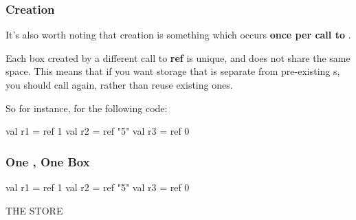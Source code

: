 \documentclass[aspectratio=169, handout]{beamer}
\begin{document}
\begin{frame}[fragile]
  \frametitle{ Creation}

  It's also worth noting that  creation is something which occurs
  \textbf{once per call to }.

  \pause
  \vspace{\fill}

  Each box created by a different call to \textbf{ref} is unique, and does not
  share the same space. This means that if you want storage that is separate
  from pre-existing s, you should call  again, rather than
  reuse existing ones.

  \pause
  \vspace{\fill}

  So for instance, for the following code:

  \begin{codeblock}
    val r1 = ref 1
    val r2 = ref "5"
    val r3 = ref 0
  \end{codeblock}
\end{frame}

\begin{frame}[fragile]
  \frametitle{One , One Box}

  \begin{center}
    \begin{minipage}[t][2.5in][t]{0.55\textwidth}
      \vspace{\fill}
      \begin{codeblock}
        val r1 = ref 1
        val r2 = ref "5"
        val r3 = ref 0
      \end{codeblock}
      \vspace{\fill}
    \end{minipage}
    \hfill\vline\hfill
    \begin{minipage}[t][2.5in][t]{0.35\textwidth}
      \centering
      {\hspace{-20pt}\color{gray} \large THE STORE}

      \vspace{\fill}
      \begin{tikzpicture}
      \end{tikzpicture}
      \vspace{\fill}
    \end{minipage}
  \end{center}
\end{frame}
\end{document}
